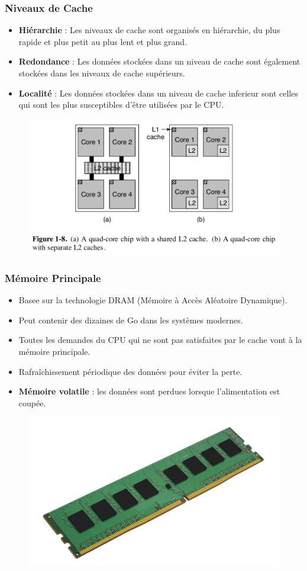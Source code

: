 \documentclass[8pt]{beamer}
\begin{document}
\begin{frame}
    \frametitle{Niveaux de Cache}
    \begin{itemize}
        \item \textbf{Hiérarchie} : Les niveaux de cache sont organisés en
              hiérarchie, du plus rapide et plus petit au plus lent et plus
              grand.
        \item \textbf{Redondance} : Les données stockées dans un niveau de
              cache
              sont également stockées dans les niveaux de cache supérieurs.
        \item \textbf{Localité} : Les données stockées dans un niveau de cache
              inferieur sont celles qui sont les plus susceptibles d'être
              utilisées par le CPU.
    \end{itemize}
    \begin{figure}
        \centering
        \includegraphics[width=.6\textwidth]{figures/ProcCoresCache_T.png}
    \end{figure}
\end{frame}

\begin{frame}
    \frametitle{Mémoire Principale}
    \begin{itemize}
        \item Basee sur la technologie DRAM (Mémoire à Accès Aléatoire
              Dynamique).
        \item Peut contenir des dizaines de Go dans les
              systèmes modernes.
        \item Toutes les demandes du CPU qui ne sont pas
              satisfaites par le cache vont à la mémoire principale.
        \item Rafraîchissement périodique des données pour éviter la
              perte.
        \item \textbf{Mémoire volatile} : les données sont perdues lorsque
              l'alimentation est coupée.
    \end{itemize}
    \begin{figure}
        \centering
        \includegraphics[width=.5\textwidth]{figures/DRAM.png}
    \end{figure}
\end{frame}
\end{document}
